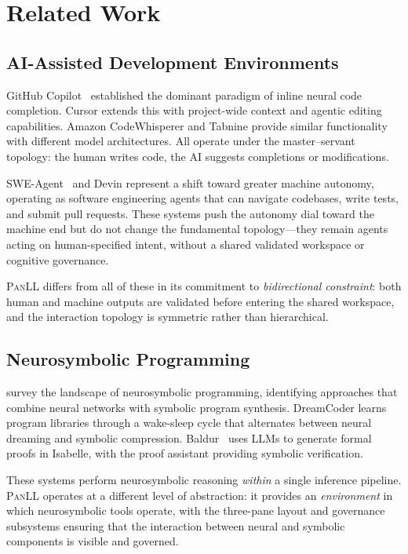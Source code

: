 \documentclass[11pt,a4paper]{article}
\newcommand{\panll}{\textsc{PanLL}}
\begin{document}
\section{Related Work}\label{sec:related}

\subsection{AI-Assisted Development Environments}

GitHub Copilot~\citep{chen2021evaluating} established the dominant
paradigm of inline neural code completion. Cursor extends this with
project-wide context and agentic editing capabilities. Amazon
CodeWhisperer and Tabnine provide similar functionality with
different model architectures. All operate under the master--servant
topology: the human writes code, the AI suggests completions or
modifications.

SWE-Agent~\citep{yang2024sweagent} and Devin represent a shift
toward greater machine autonomy, operating as software engineering
agents that can navigate codebases, write tests, and submit pull
requests. These systems push the autonomy dial toward the machine
end but do not change the fundamental topology---they remain agents
acting on human-specified intent, without a shared validated workspace
or cognitive governance.

\panll{} differs from all of these in its commitment to
\textit{bidirectional constraint}: both human and machine outputs
are validated before entering the shared workspace, and the
interaction topology is symmetric rather than hierarchical.

\subsection{Neurosymbolic Programming}

\citet{chaudhuri2021neurosymbolic} survey the landscape of
neurosymbolic programming, identifying approaches that combine
neural networks with symbolic program synthesis. DreamCoder
\citep{ellis2021dreamcoder} learns program libraries through a
wake-sleep cycle that alternates between neural dreaming and
symbolic compression. Baldur~\citep{first2023baldur} uses LLMs to
generate formal proofs in Isabelle, with the proof assistant
providing symbolic verification.

These systems perform neurosymbolic reasoning \textit{within} a
single inference pipeline. \panll{} operates at a different level
of abstraction: it provides an \textit{environment} in which
neurosymbolic tools operate, with the three-pane layout and
governance subsystems ensuring that the interaction between neural
and symbolic components is visible and governed.
\end{document}
